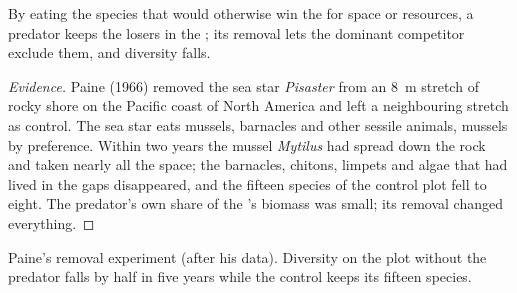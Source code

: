 \begin{proposition}\label{prop:b1:species-interactions:paine}
By eating the species that would otherwise win the  for
space or resources, a predator keeps the losers in the ; its
removal lets the dominant competitor exclude them, and diversity
falls.
\end{proposition}
\begin{proof}[Evidence]
Paine (1966) removed the sea star \emph{Pisaster} from an
\qty{8}{m} stretch of rocky shore on the Pacific coast of North
America and left a neighbouring stretch as control. The sea star eats
mussels, barnacles and other sessile animals, mussels by preference.
Within two years the mussel \emph{Mytilus} had spread down the rock
and taken nearly all the space; the barnacles, chitons, limpets and
algae that had lived in the gaps disappeared, and the fifteen
species of the control plot fell to eight. The predator's own share of
the 's biomass was small; its removal changed everything.
\end{proof}

\begin{omfigure}

{\small Paine's removal experiment (after his data). Diversity on the
plot without the predator falls by half in five years while the
control keeps its fifteen species.}
\end{omfigure}

